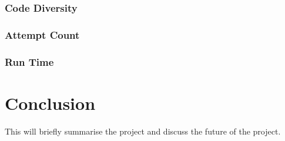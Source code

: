 \documentclass[12pt]{extarticle}
\begin{document}
\subsubsection{Code Diversity}
\subsubsection{Attempt Count}
\subsubsection{Run Time}

\section{Conclusion}

This will briefly summarise the project and discuss the future of the project.

\newpage
\end{document}
